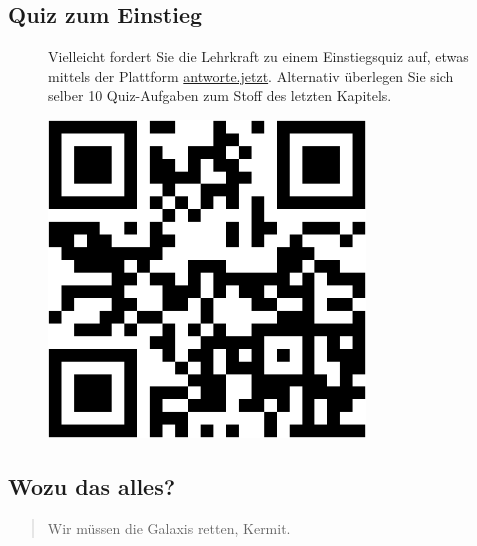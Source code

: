 \documentclass[
  a4paper,
]{scrbook}
\theoremstyle{definition}
\theoremstyle{definition}
\theoremstyle{definition}
\theoremstyle{remark}
\begin{document}
\subsection{Quiz zum Einstieg}\label{quiz-zum-einstieg}

\begin{figure}

\begin{minipage}{0.80\linewidth}
Vielleicht fordert Sie die Lehrkraft zu einem Einstiegsquiz auf, etwas
mittels der Plattform \href{https://antworte.jetzt/}{antworte.jetzt}.
Alternativ überlegen Sie sich selber 10 Quiz-Aufgaben zum Stoff des
letzten Kapitels.\end{minipage}%
%
\begin{minipage}{0.20\linewidth}

\begin{center}
\includegraphics[width=0.75\textwidth,height=\textheight]{040-verbildlichen_files/figure-pdf/unnamed-chunk-3-1.pdf}
\end{center}

\end{minipage}%

\end{figure}%

\subsection{Wozu das alles?}\label{wozu-das-alles}

\begin{quote}
{} Wir müssen die Galaxis retten, Kermit.
\end{quote}
\end{document}
